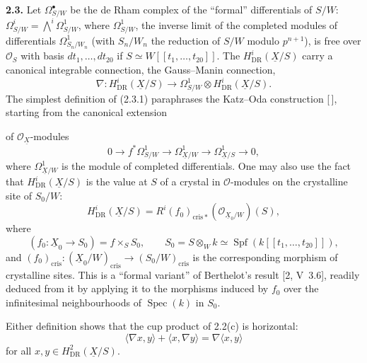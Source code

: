 \documentclass[10pt]{article}
\newcommand{\UX}{\underline{X}}
\begin{document}
\noindent\textbf{2.3.} Let $\Omega^\bullet_{S/W}$ be the de Rham complex of the ``formal'' differentials of $S/W$: $\Omega^i_{S/W}=\bigwedge^i\Omega^1_{S/W}$, where $\Omega^1_{S/W}$, the inverse limit of the completed modules of differentials $\Omega^1_{S_n/W_n}$ (with $S_n/W_n$ the reduction of $S/W$ modulo $p^{n+1}$), is free over $\mathcal O_S$ with basis $dt_1,\ldots,dt_{20}$ if $S\simeq W[[t_1,\ldots,t_{20}]]$. The $H^i_{\mathrm{DR}}(\UX/S)$ carry a canonical integrable connection, the Gauss--Manin connection,
\begin{equation}\tag{2.3.1}
\nabla:H^i_{\mathrm{DR}}(\UX/S)\longrightarrow\Omega^1_{S/W}\otimes H^i_{\mathrm{DR}}(\UX/S).
\end{equation}
The simplest definition of (2.3.1) paraphrases the Katz--Oda construction [\,], starting from the canonical extension
\newpage
\setcounter{footnote}{0}
\fontsize{10.2pt}{12.04pt}\selectfont

of $\mathcal O_{\UX}$-modules
\begin{equation}\tag{2.3.0}
0\longrightarrow f^*\Omega^1_{S/W}\longrightarrow\Omega^1_{\UX/W}\longrightarrow\Omega^1_{\UX/S}\longrightarrow0,
\end{equation}
where $\Omega^1_{\UX/W}$ is the module of completed differentials. One may also use the fact that $H^i_{\mathrm{DR}}(\UX/S)$ is the value at $S$ of a crystal in $\mathcal O$-modules on the crystalline site of $S_0/W$:
\begin{equation}\tag{2.3.2}
H^i_{\mathrm{DR}}(\UX/S)=R^i(f_0)_{\mathrm{cris}*}(\mathcal O_{\UX_0/W})(S),
\end{equation}
where
\begin{equation}\tag{2.3.2.1}
(f_0:\UX_0\to S_0)=f\times_S S_0,\qquad
S_0=S\otimes_W k\simeq\operatorname{Spf}(k[[t_1,\ldots,t_{20}]]),
\end{equation}
and $(f_0)_{\mathrm{cris}}:(\UX_0/W)_{\mathrm{cris}}\to(S_0/W)_{\mathrm{cris}}$ is the corresponding morphism of crystalline sites. This is a ``formal variant'' of Berthelot's result [2, V~3.6], readily deduced from it by applying it to the morphisms induced by $f_0$ over the infinitesimal neighbourhoods of $\operatorname{Spec}(k)$ in $S_0$.

Either definition shows that the cup product of 2.2(c) is horizontal:
\begin{equation}\tag{2.3.3}
\langle\nabla x,y\rangle+\langle x,\nabla y\rangle=\nabla\langle x,y\rangle
\end{equation}
for all $x,y\in H^2_{\mathrm{DR}}(\UX/S)$.
\end{document}

